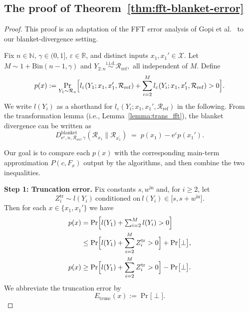 \documentclass{article}
\theoremstyle{plain}
\theoremstyle{definition}
\begin{document}
\subsection{The proof of Theorem~\ref{thm:fft-blanket-error}}
\label{app:proof-fft-blanket-error}

\fftblanketerror*



\begin{proof}
This proof is an adaptation of the FFT error analysis of Gopi et al.~\cite{gopiNumericalCompositionDifferential2021} to our blanket-divergence setting.


Fix $n\in\mathbb N$, $\gamma\in(0,1]$, $\varepsilon\in\mathbb R$, and distinct inputs
$x_1,x_1'\in\mathcal X$.
Let $M\sim 1+\mathrm{Bin}(n-1,\gamma)$ and
$
  Y_{2:n} \stackrel{\mathrm{i.i.d.}}{\sim} \mathcal R_{\mathrm{ref}},
$
all independent of $M$.
Define
\begin{equation}
  \label{eq:px-def}
  p(x)
  :=
  \Pr_{Y_1\sim \mathcal{R}_{x}}\Bigl[l_\varepsilon(Y_1;x_1,x_1',\mathcal R_{\mathrm{ref}})+\sum_{i=2}^M l_\varepsilon(Y_i;x_1,x_1',\mathcal R_{\mathrm{ref}}) > 0\Bigr].
\end{equation}
We write $l(Y_i)$ as a shorthand for
$l_\varepsilon(Y_i;x_1,x_1',\mathcal R_{\mathrm{ref}})$ in the following.
From the transformation lemma (i.e., Lemma~\ref{lemma:trans_fft}), the blanket divergence can be written as
\[
  D_{\mathrm{e}^\varepsilon,n,\mathcal{R}_\mathrm{ref},\gamma}^\mathrm{blanket}(\mathcal{R}_{x_1} \| \mathcal{R}_{x_1^\prime})
  \;=\;
  p(x_1) - \mathrm e^\varepsilon p(x_1').
\]

Our goal is to compare each $p(x)$ with the corresponding main-term approximation
$P(c,F_x)$ output by the algorithms, and then combine the two inequalities.

\medskip

\textbf{Step 1: Truncation error.}
Fix constants $s, w^{\mathrm{in}}$ and,
for $i\ge2$, let
\[
  Z_i^{\mathrm{tr}}
  \sim l(Y_i)
  \ \text{conditioned on}\
  l(Y_i)\in\bigl[s, s + w^{\mathrm{in}}\bigr].
\]
Then for each $x\in\{x_1,x_1'\}$ we have
\begin{align}
  p(x)
  &= \Pr\Bigl[l(Y_1)+\textstyle\sum_{i=2}^M l(Y_i)>0\Bigr]
  \notag\\
  &\le
  \Pr\Bigl[
    l(Y_1)+\sum_{i=2}^M Z_i^{\mathrm{tr}} > 0
  \Bigr]
  + \Pr\bigl[\perp\bigr],
  \label{eq:trunc-upper}
  \\
  p(x)
  &\ge
  \Pr\Bigl[
    l(Y_1)+\sum_{i=2}^M Z_i^{\mathrm{tr}} > 0
  \Bigr]
  - \Pr\bigl[\perp\bigr].
  \label{eq:trunc-lower}
\end{align}
We abbreviate the truncation error by
\[
  E_{\mathrm{trunc}}(x)
  :=
  \Pr\bigl[\perp\bigr].
\]


\end{proof}
\end{document}
